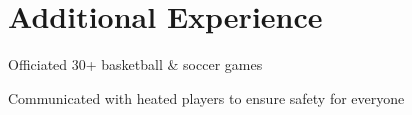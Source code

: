 \documentclass[]{deedy-resume-openfont}
\begin{document}
\begin{minipage}[t]{0.66\textwidth}
    \section {Additional Experience}
    \begin{tightemize}
        \item Officiated 30+ basketball \& soccer games
        \item Communicated with heated players to ensure safety for everyone
    \end{tightemize}






\end{minipage}
\end{document}
